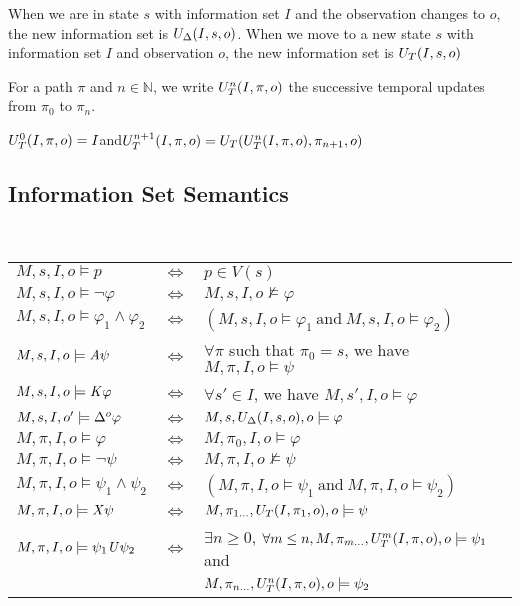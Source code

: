 When we are in state $s$ with information set $I$ and the observation changes to $o$, the new information set is $U_{\Delta}(I,s,o)$.
When we move to a new state $s$ with information set $I$ and observation $o$, the new information set is $U_T(I,s,o)$

For a path $\pi$ and $n\in\mathbb{N}$, we write $U_T^n(I,\pi,o)$ the successive temporal updates from $\pi_0$ to $\pi_n$.

$U_T^0(I,\pi,o)=I$\quad and\quad$U_T^{n+1}(I,\pi,o)=U_T(U_T^n(I,\pi,o),\pi_{n+1},o)$

\subsection{Information Set Semantics}~

\begin{tabular}{l c l}
  $M,s,I,o\models p $&$ \iff $&$ p\in V(s)$\\
  $M,s,I,o\models\neg\varphi $&$ \iff $&$ M,s,I,o\not\models\varphi$\\
  $M,s,I,o\models \varphi_1\wedge\varphi_2 $&$ \iff $&$ (M,s,I,o\models\varphi_1~\text{and}~M,s,I,o\models\varphi_2)$\\
  $M,s,I,o\models\mathit{A}\psi $&$ \iff $&$ \forall\pi$ such that $\pi_0=s$, we have $M,\pi,I,o\models\psi$\\
  $M,s,I,o\models\mathit{K}\varphi $&$ \iff $&$ \forall s'\in I$, we have $M,s',I,o\models\varphi$\\
  $M,s,I,o'\models\Delta^{o}\varphi $&$ \iff $&$ M,s,U_{\Delta}(I,s,o),o\models\varphi$\\
  $M,\pi,I,o\models\varphi $&$ \iff $&$ M,\pi_0,I,o\models\varphi$\\
  $M,\pi,I,o\models\neg\psi $&$ \iff $&$ M,\pi,I,o\not\models\psi$\\
  $M,\pi,I,o\models\psi_1\wedge\psi_2 $&$ \iff $&$ (M,\pi,I,o\models\psi_1~\text{and}~M,\pi,I,o\models\psi_2)$\\
  $M,\pi,I,o\models\mathit{X}\psi $&$ \iff $&$ M,\pi_{1\dots},U_T(I,\pi_1,o),o\models\psi$\\
  $M,\pi,I,o\models\psi_1\mathit{U}\psi_2 $&$ \iff $&$ \exists n\geq 0$, $\forall m\leq n, M,\pi_{m\dots},U_T^m(I,\pi,o),o\models\psi_1$ and\\
   & & $M,\pi_{n\dots},U_T^n(I,\pi,o),o\models\psi_2$
\end{tabular}
